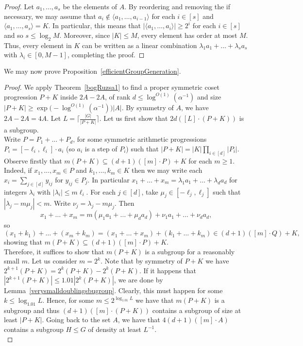 \documentclass[a4paper,11pt]{article}
\numberwithin{theorem}{section}
\theoremstyle{definition}
\begin{document}
\begin{proof}
    Let $a_1, \dots, a_s$ be the elements of $A$. By reordering and removing the if necessary, we may assume that $a_i \notin \langle a_1, \dots, a_{i-1}\rangle$ for each $i \in [s]$ and $\langle a_1, \dots, a_s\rangle = K$. In particular, this means that $|\langle a_1, \dots, a_i\rangle| \geq 2^i$ for each $i \in [s]$ and so $s \leq \log_2 M$. Moreover, since $|K|\leq M$, every element has order at most $M$. Thus, every element in $K$ can be written as a linear combination $\lambda_1 a_1 + \dots + \lambda_s a_s$ with $\lambda_i \in [0, M - 1]$, completing the proof.
\end{proof}

We may now prove Proposition~\ref{efficientGroupGeneration}.

\begin{proof}
    We apply Theorem~\ref{bogRuzsa1} to find a proper symmetric coset progression $P + K$ inside $2A - 2A$, of rank $d \leq \log^{O(1)}(\alpha^{-1})$ and size $|P + K| \geq \exp\Big(-\log^{O(1)}(\alpha^{-1})\Big)|A|$. By symmetry of $A$, we have $2A - 2A = 4A$. Let $L = \Big\lceil\frac{|G|}{|P + K|}\Big\rceil$. Let us first show that $2d([L] \cdot (P + K))$ is a subgroup.\\

    Write $P = P_1 + \dots + P_d$, for some symmetric arithmetic progressions $P_i = [-\ell_i, \ell_i] \cdot a_i$ (so $a_i$ is a step of $P_i$) such that $|P + K| = |K| \prod_{i \in [d]}|P_i|$. Observe firstly that $m (P + K) \subseteq (d + 1) ([m] \cdot P) + K$ for each $m \geq 1$. Indeed, if $x_1, \dots, x_m \in P$ and $k_1, \dots, k_m \in K$ then we may write each $x_i = \sum_{j \in [d]} y_{ij}$ for $y_{ij} \in P_j$. In particular $x_1 + \dots + x_m = \lambda_1 a_1 + \dots + \lambda_d a_d$ for integers $\lambda_i$ with $|\lambda_i| \leq m \ell_i$. For each $j \in [d]$, take $\mu_j \in [-\ell_j, \ell_j]$ such that $|\lambda_j - m \mu_j| < m$. Write $\nu_j = \lambda_j - m \mu_j$. Then
    \[x_1 + \dots + x_m = m(\mu_1 a_1 + \dots + \mu_d a_d) + \nu_1 a_1 + \dots + \nu_d a_d,\]
    so \[(x_1 + k_1) + \dots + (x_m + k_m) = (x_1 + \dots + x_m) + (k_1 + \dots + k_m) \in (d + 1)([m] \cdot Q) + K,\]
    showing that $m (P + K) \subseteq (d + 1) ([m] \cdot P) + K$.\\

    Therefore, it suffices to show that $m (P + K)$ is a subgroup for a reasonably small $m$. Let us consider $m = 2^k$. Note that by symmetry of $P + K$ we have $2^{k + 1}(P + K) = 2^k(P + K) - 2^k (P + K)$. If it happens that $|2^{k + 1}(P + K)| \leq 1.01 |2^{k}(P + K)|$,  we are done by Lemma~\ref{verysmalldoublingsbugroup}. Clearly, this must happen for some $k \leq \log_{1.01} L$. Hence, for some $m \leq 2^{\log_{1.01} L}$ we have that $m(P + K)$ is a subgroup and thus $(d + 1) ([m] \cdot (P + K))$ contains a subgroup of size at least $|P + K|$. Going back to the set $A$, we have that $4(d + 1) ([m] \cdot A)$ contains a subgroup $H \leq G$ of density at least $L^{-1}$.\\


\end{proof}
\end{document}

